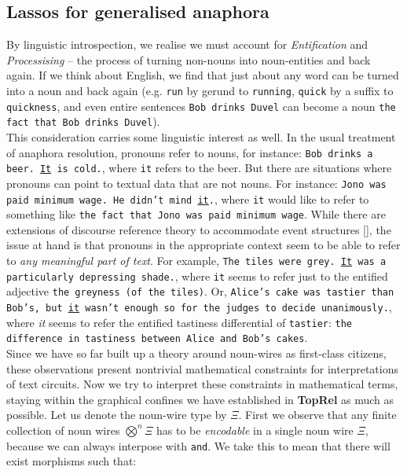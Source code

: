 \begin{fullwidth}

\section{Lassos for generalised anaphora}

 By linguistic introspection, we realise we must account for \emph{Entification} and \emph{Processising} -- the process of turning non-nouns into noun-entities and back again. If we think about English, we find that just about any word can be turned into a noun and back again (e.g. \texttt{run} by gerund to \texttt{running}, \texttt{quick} by a suffix to \texttt{quickness}, and even entire sentences \texttt{Bob drinks Duvel} can become a noun \texttt{the fact that Bob drinks Duvel}).\\

This consideration carries some linguistic interest as well. In the usual treatment of anaphora resolution, pronouns refer to nouns, for instance: \texttt{Bob drinks a beer. \underline{It} is cold.}, where \texttt{it} refers to the beer. But there are situations where pronouns can point to textual data that are not nouns. For instance: \texttt{Jono was paid minimum wage. He didn't mind \underline{it}.}, where \texttt{it} would like to refer to something like \texttt{the fact that Jono was paid minimum wage}. While there are extensions of discourse reference theory to accommodate event structures [], the issue at hand is that pronouns in the appropriate context seem to be able to refer to \emph{any meaningful part of text}. For example, \texttt{The tiles were grey. \underline{It} was a particularly depressing shade.}, where \texttt{it} seems to refer just to the entified adjective \texttt{the greyness (of the tiles)}. Or, \texttt{Alice's cake was tastier than Bob's, but \underline{it} wasn't enough so for the judges to decide unanimously.}, where \emph{it} seems to refer the entified tastiness differential of \texttt{tastier}: \texttt{the difference in tastiness between Alice and Bob's cakes}.\\

Since we have so far built up a theory around noun-wires as first-class citizens, these observations present nontrivial mathematical constraints for interpretations of text circuits. Now we try to interpret these constraints in mathematical terms, staying within the graphical confines we have established in \textbf{TopRel} as much as possible. Let us denote the noun-wire type by $\Xi$. First we observe that any finite collection of noun wires $\bigotimes^n \Xi$ has to be \emph{encodable} in a single noun wire $\Xi$, because we can always interpose with \texttt{and}. We take this to mean that there will exist morphisms such that:


\end{fullwidth}
